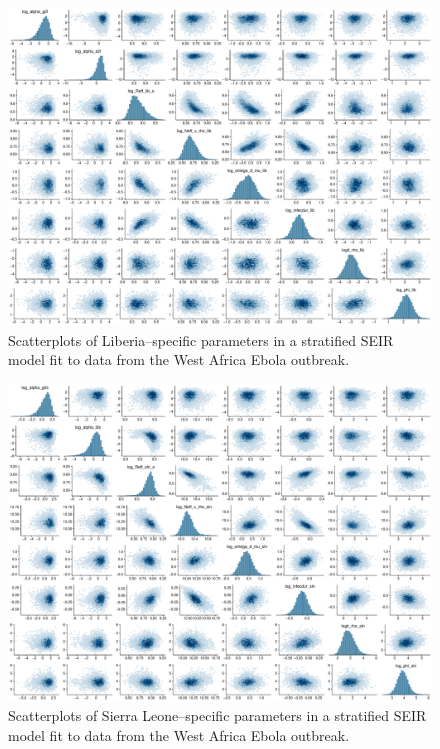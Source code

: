 \begin{figure}[htbp]
	\centering
	\includegraphics[width=\linewidth]{figures/ebola_joint_pairs_lib}
	\caption{Scatterplots of Liberia--specific parameters in a stratified SEIR model fit to data from the West Africa Ebola outbreak.}
\end{figure}

\begin{figure}[htbp]
	\centering
	\includegraphics[width=\linewidth]{figures/ebola_joint_pairs_sln}
	\caption{Scatterplots of Sierra Leone--specific parameters in a stratified SEIR model fit to data from the West Africa Ebola outbreak.}
\end{figure}

